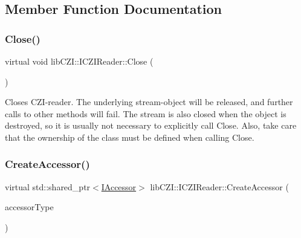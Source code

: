 \subsection{Member Function Documentation}
\mbox{\label{classlib_c_z_i_1_1_i_c_z_i_reader_aef45f08b7e9cec6a40ab7ee50285eaba}} 
\subsubsection{\texorpdfstring{Close()}{Close()}}
{\footnotesize\ttfamily virtual void lib\+C\+Z\+I\+::\+I\+C\+Z\+I\+Reader\+::\+Close (\begin{DoxyParamCaption}{ }\end{DoxyParamCaption})\hspace{0.3cm}{\ttfamily [pure virtual]}}

Closes C\+Z\+I-\/reader. The underlying stream-\/object will be released, and further calls to other methods will fail. The stream is also closed when the object is destroyed, so it is usually not necessary to explicitly call {\ttfamily Close}. Also, take care that the ownership of the class must be defined when calling {\ttfamily Close}. \mbox{\label{classlib_c_z_i_1_1_i_c_z_i_reader_a3fe8c576a58058e9bbebb9c9fd5633b0}} 
\subsubsection{\texorpdfstring{Create\+Accessor()}{CreateAccessor()}}
{\footnotesize\ttfamily virtual std\+::shared\+\_\+ptr$<$\hyperlink{classlib_c_z_i_1_1_i_accessor}{I\+Accessor}$>$ lib\+C\+Z\+I\+::\+I\+C\+Z\+I\+Reader\+::\+Create\+Accessor (\begin{DoxyParamCaption}\item[{\hyperlink{namespacelib_c_z_i_aa626474324df92c9cdc7258cdb1e677c}{Accessor\+Type}}]{accessor\+Type }\end{DoxyParamCaption})\hspace{0.3cm}{\ttfamily [pure virtual]}}

